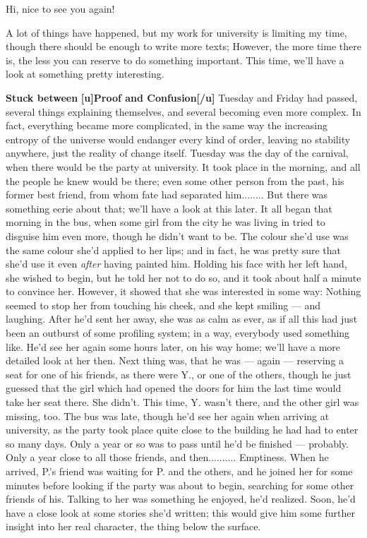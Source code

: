 Hi, nice to see you again!

A lot of things have happened, but my work for university is limiting my time, though there should be enough to write more texts; However, the more time there is, the less you can reserve to do something important. This time, we'll have a look at something pretty interesting. 

\textbf{Stuck between}
\textbf{[u]Proof and Confusion[/u]}
Tuesday and Friday had passed, several things explaining themselves, and several becoming even more complex. In fact, everything became more complicated, in the same way the increasing entropy of the universe would endanger every kind of order, leaving no stability anywhere, just the reality of change itself. 
Tuesday was the day of the carnival, when there would be the party at university. It took place in the morning, and all the people he knew would be there; even some other person from the past, his former best friend, from whom fate had separated him........
But there was something eerie about that; we'll have a look at this later. It all began that morning in the bus, when some girl from the city he was living in tried to disguise him even more, though he didn't want to be. The colour she'd use was the same colour she'd applied to her lips; and in fact, he was pretty sure that she'd use it even \emph{after} having painted him. Holding his face with her left hand, she wished to begin, but he told her not to do so, and it took about half a minute to convince her. However, it showed that she was interested in some way: Nothing seemed to stop her from touching his cheek, and she kept smiling --- and laughing. After he'd sent her away, she was as calm as ever, as if all this had just been an outburst of some profiling system; in a way, everybody used something like. He'd see her again some hours later, on his way home; we'll have a more detailed look at her then. 
Next thing was, that he was --- again --- reserving a seat for one of his friends, as there were Y., or one of the others, though he just guessed that the girl which had opened the doors for him the last time would take her seat there. 
She didn't. 
This time, Y. wasn't there, and the other girl was missing, too. The bus was late, though he'd see her again when arriving at university, as the party took place quite close to the building he had had to enter so many days. Only a year or so was to pass until he'd be finished --- probably. Only a year close to all those friends, and then.......... Emptiness. 
When he arrived, P.'s friend was waiting for P. and the others, and he joined her for some minutes before looking if the party was about to begin, searching for some other friends of his. Talking to her was something he enjoyed, he'd realized. Soon, he'd have a close look at some stories she'd written; this would give him some further insight into her real character, the thing below the surface. 
